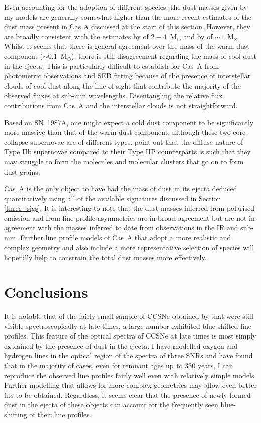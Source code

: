 Even accounting for the adoption of different species, the dust masses given by my models are generally somewhat higher than the more recent estimates of the dust mass present in Cas A discussed at the start of this section.  However, they are broadly consistent with the estimates by \citet{Dunne2003} of $2-4$~M$_{\odot}$ and by \citet{Dunne2009} of $\sim1$~M$_{\odot}$.  Whilst it seems that there is general agreement over the mass of the warm dust component ($\sim0.1$~M$_{\odot}$), there is still disagreement regarding the mass of cool dust in the ejecta.  This is particularly difficult to establish for Cas~A from photometric observations and SED fitting because of the presence of interstellar clouds of cool dust along the line-of-sight that contribute  the majority of the observed fluxes at sub-mm wavelengths.  Disentangling the relative flux contributions from Cas~A and the interstellar clouds is not straightforward.

Based on SN~1987A, one might expect a cold dust component to be significantly more massive than that of the warm dust component, although these two core-collapse supernovae are of different types. \citet{Biscaro2014} point out that the diffuse nature of Type IIb supernovae compared to their Type IIP counterparts is such that they may struggle to form the molecules and molecular clusters that go on to form dust grains.   

Cas~A is the only object to have had the mass of dust in its ejecta deduced quantitatively using all of the available signatures discussed in Section \ref{three_sigs}.  It is interesting to note that the dust masses inferred from polarised emission and from line profile asymmetries are in broad agreement but are not in agreement with the masses inferred to date from observations in the IR and sub-mm.  Further line profile models of Cas~A that adopt a more realistic and complex geometry  and also include a more representative selection of species will hopefully help to constrain the total dust masses more effectively.  

\section{Conclusions}

It is notable that of the fairly small sample of CCSNe obtained by \citet{Milisavljevic2012} that were still visible spectroscopically at late times, a large number exhibited blue-shifted line profiles.  This feature of the optical spectra of CCSNe at late times is most simply explained by the presence of dust in the ejecta.  I have modelled oxygen and hydrogen lines in the optical region of the spectra of three SNRs and have found that in the majority of cases, even for remnant ages up to 330 years, I can reproduce the  observed line profiles fairly well even with relatively simple models.  Further modelling that allows for more complex geometries may allow even better fits to be obtained.  Regardless, it seems clear that the presence of newly-formed dust in the ejecta of these objects can account for the frequently seen blue-shifting of their line profiles.

